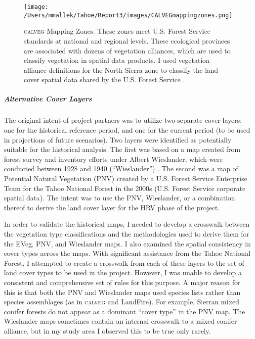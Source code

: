 \begin{wrapfigure}{R}{0.5\textwidth} %
\texttt{[image: /Users/mmallek/Tahoe/Report3/images/CALVEGmappingzones.png]}
\caption{\small \textsc{calveg} Mapping Zones. These zones meet U.S. Forest Service standards at national and regional levels. These ecological provinces are associated with dozens of vegetation alliances, which are used to classify vegetation in spatial data products. I used vegetation alliance definitions for the North Sierra zone to classify the land cover spatial data shared by the U.S. Forest Service \citep{calvegphoto}.} 
\label{calveg}
\end{wrapfigure}

\subparagraph*{Alternative Cover Layers}
The original intent of project partners was to utilize two separate cover layers: one for the historical reference period, and one for the current period (to be used in projections of future scenarios). Two layers were identified as potentially suitable for the historical analysis. The first was based on a map created from forest survey and inventory efforts under Albert Wieslander, which were conducted between 1928 and 1940 (``Wieslander'') \citep{Thorne2006}. The second was a map of Potential Natural Vegetation (PNV) created by a U.S. Forest Service Enterprise Team for the Tahoe National Forest in the 2000s (U.S. Forest Service corporate spatial data). The intent was to use the PNV, Wieslander, or a combination thereof to derive the land cover layer for the HRV phase of the project. 

In order to validate the historical maps, I needed to develop a crosswalk between the vegetation type classifications and the methodologies used to derive them for the EVeg, PNV, and Wieslander maps. I also examined the spatial consistency in cover types across the maps. With significant assistance from the Tahoe National Forest, I attempted to create a crosswalk from each of these layers to the set of land cover types to be used in the project. However, I was unable to develop a consistent and comprehensive set of rules for this purpose. A major reason for this is that both the PNV and Wieslander maps used species lists rather than species assemblages (as in \textsc{calveg} and LandFire). For example, Sierran mixed conifer forests do not appear as a dominant ``cover type'' in the PNV map. The Wieslander maps sometimes contain an internal crosswalk to a mixed conifer alliance, but in my study area I observed this to be true only rarely. 

